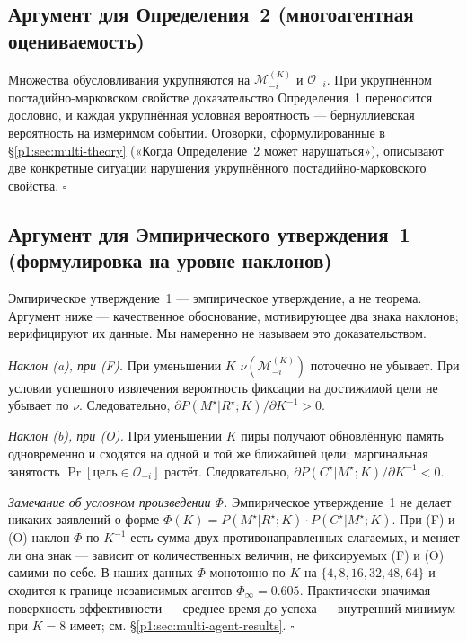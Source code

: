 \documentclass{article}
\begin{document}
\subsection{Аргумент для Определения~2 (многоагентная оцениваемость)}

Множества обусловливания укрупняются на $\mathcal{M}_{-i}^{(K)}$ и $\mathcal{O}_{-i}$. При укрупнённом постадийно-марковском свойстве доказательство Определения~1 переносится дословно, и каждая укрупнённая условная вероятность --- бернуллиевская вероятность на измеримом событии. Оговорки, сформулированные в \S\ref{p1:sec:multi-theory} («Когда Определение~2 может нарушаться»), описывают две конкретные ситуации нарушения укрупнённого постадийно-марковского свойства. \hfill$\square$

\subsection{Аргумент для Эмпирического утверждения~1 (формулировка на уровне наклонов)}

Эмпирическое утверждение~1 --- эмпирическое утверждение, а не теорема. Аргумент ниже --- качественное обоснование, мотивирующее два знака наклонов; верифицируют их данные. Мы намеренно не называем это доказательством.

\emph{Наклон (a), при (F).} При уменьшении $K$ $\nu(\mathcal{M}_{-i}^{(K)})$ поточечно не убывает. При условии успешного извлечения вероятность фиксации на достижимой цели не убывает по $\nu$. Следовательно, $\partial P(M^\star|R^\star;K) / \partial K^{-1} > 0$.

\emph{Наклон (b), при (O).} При уменьшении $K$ пиры получают обновлённую память одновременно и сходятся на одной и той же ближайшей цели; маргинальная занятость $\Pr[\text{цель}\in\mathcal{O}_{-i}]$ растёт. Следовательно, $\partial P(C^\star|M^\star;K) / \partial K^{-1} < 0$.

\emph{Замечание об условном произведении $\Phi$.} Эмпирическое утверждение~1 не делает никаких заявлений о форме $\Phi(K) = P(M^\star|R^\star;K)\!\cdot\!P(C^\star|M^\star;K)$. При (F) и (O) наклон $\Phi$ по $K^{-1}$ есть сумма двух противонаправленных слагаемых, и меняет ли она знак --- зависит от количественных величин, не фиксируемых (F) и (O) самими по себе. В наших данных $\Phi$ монотонно по $K$ на $\{4,8,16,32,48,64\}$ и сходится к границе независимых агентов $\Phi_\infty = 0.605$. Практически значимая поверхность эффективности --- среднее время до успеха --- внутренний минимум при $K=8$ имеет; см. \S\ref{p1:sec:multi-agent-results}. \hfill$\square$
\end{document}
